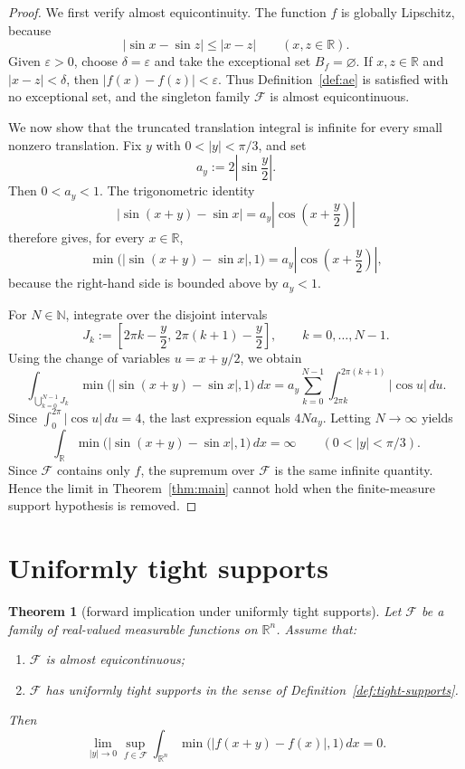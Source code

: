 \documentclass[11pt]{article}
\theoremstyle{plain}
\newtheorem{theorem}{Theorem}
\theoremstyle{definition}
\theoremstyle{remark}
\newcommand{\R}{\mathbb{R}}
\newcommand{\F}{\mathcal{F}}
\newcommand{\eps}{\varepsilon}
\begin{document}
\begin{proof}
We first verify almost equicontinuity. The function $f$ is globally
Lipschitz, because
\[
    |\sin x-\sin z|\le |x-z|
    \qquad (x,z\in\R).
\]
Given $\eps>0$, choose $\delta=\eps$ and take the exceptional set
$B_f=\varnothing$. If $x,z\in\R$ and $|x-z|<\delta$, then
$|f(x)-f(z)|<\eps$. Thus Definition~\ref{def:ae} is satisfied with no
exceptional set, and the singleton family $\F$ is almost equicontinuous.

We now show that the truncated translation integral is infinite for every
small nonzero translation. Fix $y$ with $0<|y|<\pi/3$, and set
\[
    a_y:=2\left|\sin\frac{y}{2}\right|.
\]
Then $0<a_y<1$. The trigonometric identity
\[
    |\sin(x+y)-\sin x|
    =
    a_y\left|\cos\left(x+\frac{y}{2}\right)\right|
\]
therefore gives, for every $x\in\R$,
\[
    \min\bigl(|\sin(x+y)-\sin x|,1\bigr)
    =
    a_y\left|\cos\left(x+\frac{y}{2}\right)\right|,
\]
because the right-hand side is bounded above by $a_y<1$.

For $N\in\mathbb N$, integrate over the disjoint intervals
\[
    J_k:=\left[2\pi k-\frac{y}{2},\,2\pi(k+1)-\frac{y}{2}\right],
    \qquad k=0,\dots,N-1.
\]
Using the change of variables $u=x+y/2$, we obtain
\[
    \int_{\bigcup_{k=0}^{N-1}J_k}
    \min\bigl(|\sin(x+y)-\sin x|,1\bigr)\,dx
    =
    a_y\sum_{k=0}^{N-1}
    \int_{2\pi k}^{2\pi(k+1)}|\cos u|\,du .
\]
Since $\int_0^{2\pi}|\cos u|\,du=4$, the last expression equals
$4Na_y$. Letting $N\to\infty$ yields
\[
    \int_{\R}\min\bigl(|\sin(x+y)-\sin x|,1\bigr)\,dx=\infty
    \qquad (0<|y|<\pi/3).
\]
Since $\F$ contains only $f$, the supremum over $\F$ is the same infinite
quantity. Hence the limit in Theorem~\ref{thm:main} cannot hold when the
finite-measure support hypothesis is removed.
\end{proof}

\section{Uniformly tight supports}

\begin{theorem}[forward implication under uniformly tight supports]\label{thm:tail}
Let $\F$ be a family of real-valued measurable functions on $\R^n$. Assume
that:
\begin{enumerate}[label=\textup{(T\arabic*)},ref=\textup{(T\arabic*)}]
    \item\label{tail:ae} $\F$ is almost equicontinuous;
    \item\label{tail:tight} $\F$ has uniformly tight supports in the sense
    of Definition~\ref{def:tight-supports}.
\end{enumerate}
Then
\[
    \lim_{|y|\to 0}\sup_{f\in\F}
    \int_{\R^n}\min\bigl(|f(x+y)-f(x)|,1\bigr)\,dx=0.
\]
\end{theorem}
\end{document}
